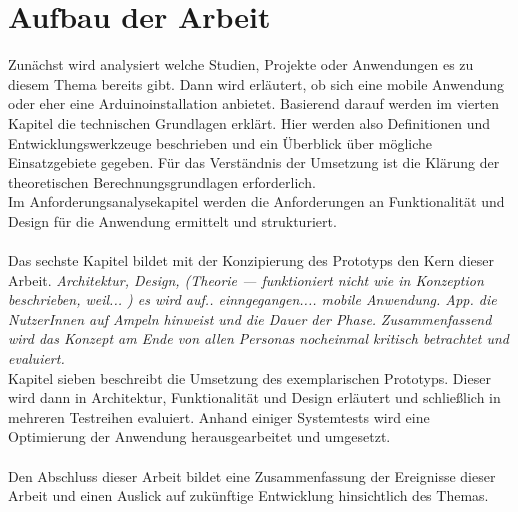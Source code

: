 \section{Aufbau der Arbeit}
Zunächst wird analysiert welche Studien, Projekte oder Anwendungen es zu diesem Thema bereits gibt. Dann wird erläutert, ob sich eine mobile Anwendung oder eher eine \gls{Arduino}installation anbietet. Basierend darauf werden im vierten Kapitel die technischen Grundlagen erklärt. Hier werden also Definitionen und Entwicklungswerkzeuge beschrieben und ein Überblick über mögliche Einsatzgebiete gegeben. Für das Verständnis der Umsetzung ist die Klärung der theoretischen Berechnungsgrundlagen erforderlich. \\
Im Anforderungsanalysekapitel werden die Anforderungen an Funktionalität und Design für die Anwendung ermittelt und strukturiert. \\\\ 
Das sechste Kapitel bildet mit der Konzipierung des Prototyps den Kern dieser Arbeit. 
\textit{Architektur, Design, (Theorie --- funktioniert nicht wie in Konzeption beschrieben, weil... )
es wird auf.. einngegangen.... mobile Anwendung. \gls{App}. die NutzerInnen auf Ampeln hinweist und die Dauer der Phase. }
\textit{Zusammenfassend wird das Konzept am Ende von allen Personas nocheinmal kritisch betrachtet und evaluiert.}\\
Kapitel sieben beschreibt die Umsetzung des exemplarischen Prototyps. Dieser wird dann in Architektur, Funktionalität und Design erläutert und schließlich in mehreren Testreihen evaluiert. Anhand einiger Systemtests wird eine Optimierung der Anwendung herausgearbeitet und umgesetzt. 
\\\\Den Abschluss dieser Arbeit bildet eine Zusammenfassung der Ereignisse dieser Arbeit und einen Auslick auf zukünftige Entwicklung hinsichtlich des Themas.

